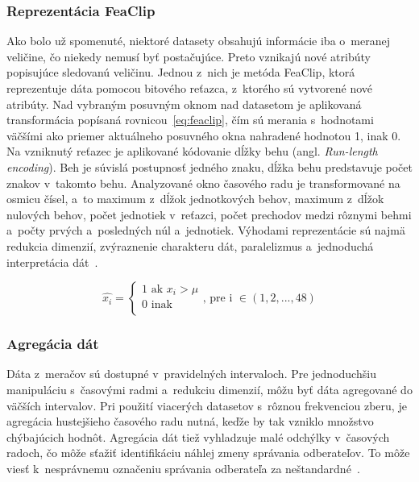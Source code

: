 \documentclass[a4paper,twoside,slovak,12pt,appendix]{article}
\begin{document}
\subsubsection{Reprezentácia FeaClip}
\label{c:feaclip-representation}
Ako bolo už spomenuté, niektoré datasety obsahujú informácie iba o~meranej
veličine, čo niekedy nemusí byť postačujúce. Preto vznikajú nové atribúty
popisujúce sledovanú veličinu. Jednou z~nich je metóda FeaClip, ktorá
reprezentuje dáta pomocou bitového reťazca, z~ktorého sú vytvorené nové
atribúty. Nad vybraným posuvným oknom nad datasetom je aplikovaná transformácia
popísaná rovnicou~\ref{eq:feaclip}, čím sú merania s~hodnotami väčšími ako
priemer aktuálneho posuvného okna nahradené hodnotou 1, inak 0. Na vzniknutý
reťazec je aplikované kódovanie dĺžky behu (angl. \textit{Run-length
encoding}). Beh je súvislá postupnosť jedného znaku, dĺžka behu predstavuje
počet znakov v~takomto behu. Analyzované okno časového radu je transformované
na osmicu čísel, a~to maximum z~dĺžok jednotkových behov, maximum z~dĺžok
nulových behov, počet jednotiek v~reťazci, počet prechodov medzi rôznymi behmi
a~počty prvých a~posledných núl a~jednotiek. Výhodami reprezentácie sú najmä
redukcia dimenzií, zvýraznenie charakteru dát, paralelizmus a~jednoduchá
interpretácia dát~\cite{Laurinec2018}.

\begin{equation}
  \label{eq:feaclip}
  \hat{x_i} =
  \begin{cases}
    1 \text{ ak } x_i > \mu \\
    0 \text{ inak } \\
  \end{cases}
  \text{, pre i } \in (1, 2, ..., 48)
\end{equation}

\subsubsection{Agregácia dát}
Dáta z~meračov sú dostupné v~pravidelných intervaloch. Pre jednoduchšiu
manipuláciu s~časovými radmi a~redukciu dimenzií, môžu byť dáta agregované do
väčších intervalov. Pri použití viacerých datasetov s~rôznou frekvenciou zberu,
je agregácia hustejšieho časového radu nutná, keďže by tak vzniklo množstvo
chýbajúcich hodnôt. Agregácia dát tiež vyhladzuje malé odchýlky v~časových
radoch, čo môže sťažiť identifikáciu náhlej zmeny správania odberateľov. To môže
viesť k~nesprávnemu označeniu správania odberateľa za
neštandardné~\cite{Cody2015}.
\end{document}
